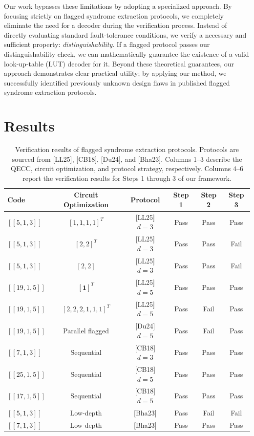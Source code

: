 \documentclass[acmsmall,screen,review,anonymous,nonacm]{acmart}
\begin{document}
Our work bypasses these limitations by adopting a specialized approach. By focusing strictly on flagged syndrome extraction protocols, we completely eliminate the need for a decoder during the verification process. Instead of directly evaluating standard fault-tolerance conditions, we verify a necessary and sufficient property: \emph{distinguishability}. If a flagged protocol passes our distinguishability check, we can mathematically guarantee the existence of a valid look-up-table (LUT) decoder for it. Beyond these theoretical guarantees, our approach demonstrates clear practical utility; by applying our method, we successfully identified previously unknown design flaws in published flagged syndrome extraction protocols.

\section{Results}
\begin{table}[htbp]
\centering
\begin{tabular}{lccccc}
\toprule
Code & Circuit Optimization & Protocol & Step 1 & Step 2 & Step 3 \\
\midrule
$[[5,1,3]]$  & $[1,1,1,1]^{T}$           & [LL25] $d=3$ & Pass & Pass & Pass \\
$[[5,1,3]]$  & $[2,2]^{T}$               & [LL25] $d=3$ & Pass & Pass & Fail \\
$[[5,1,3]]$  & $[2,2]$                   & [LL25] $d=3$ & Pass & Pass & Fail \\
$[[19,1,5]]$ & $\mathbf{[1]}^T$          & [LL25] $d=5$ & Pass & Pass & Pass \\
$[[19,1,5]]$ & $[2,2,2,1,1,1]^{T}$       & [LL25] $d=5$ & Pass & Fail & Pass \\
$[[19,1,5]]$ & Parallel flagged          & [Du24] $d=5$ & Pass & Fail & Pass \\
$[[7,1,3]]$  & Sequential                & [CB18] $d=3$ & Pass & Pass & Pass \\

$[[25,1,5]]$ & Sequential                & [CB18] $d=5$ & Pass & Pass & Pass \\
$[[17,1,5]]$ & Sequential                & [CB18] $d=5$ & Pass & Pass & Pass \\
$[[5,1,3]]$  & Low-depth                 & [Bha23]      & Pass & Fail & Fail \\
$[[7,1,3]]$  & Low-depth                 & [Bha23]      & Pass & Pass & Pass \\
\bottomrule
\end{tabular}
\caption{Verification results of flagged syndrome extraction protocols. Protocols are sourced from \cite{Liou25} [LL25], \cite{CB18} [CB18], \cite{Du24} [Du24], and \cite{low-depth} [Bha23]. Columns 1--3 describe the QECC, circuit optimization, and protocol strategy, respectively. Columns 4--6 report the verification results for Steps 1 through 3 of our framework.}\label{tab:experiment-results}
\end{table}
\end{document}
